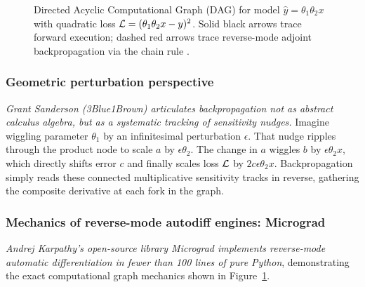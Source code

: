 \documentclass[../../main.tex]{subfiles}
\begin{document}
\begin{figure}[htbp]
{%
}
\caption{Directed Acyclic Computational Graph (DAG) for model $\hat{y} = \theta_1 \theta_2 x$ with quadratic loss $\mathcal{L} = (\theta_1 \theta_2 x - y)^2$. Solid black arrows trace forward execution; dashed red arrows trace reverse-mode adjoint backpropagation via the chain rule \cite{rumelhart1986}.}
\label{fig:adjoint_scalar_graph}
\end{figure}

\subsubsection{Geometric perturbation perspective}
\textit{Grant Sanderson (3Blue1Brown) articulates backpropagation not as abstract calculus algebra, but as a systematic tracking of sensitivity nudges.} Imagine wiggling parameter $\theta_1$ by an infinitesimal perturbation $\epsilon$. That nudge ripples through the product node to scale $a$ by $\epsilon \theta_2$. The change in $a$ wiggles $b$ by $\epsilon \theta_2 x$, which directly shifts error $c$ and finally scales loss $\mathcal{L}$ by $2c \epsilon \theta_2 x$. Backpropagation simply reads these connected multiplicative sensitivity tracks in reverse, gathering the composite derivative at each fork in the graph.

\subsubsection{Mechanics of reverse-mode autodiff engines: Micrograd}
\textit{Andrej Karpathy's open-source library Micrograd implements reverse-mode automatic differentiation in fewer than 100 lines of pure Python}, demonstrating the exact computational graph mechanics shown in Figure~\ref{fig:adjoint_scalar_graph}.
\end{document}
